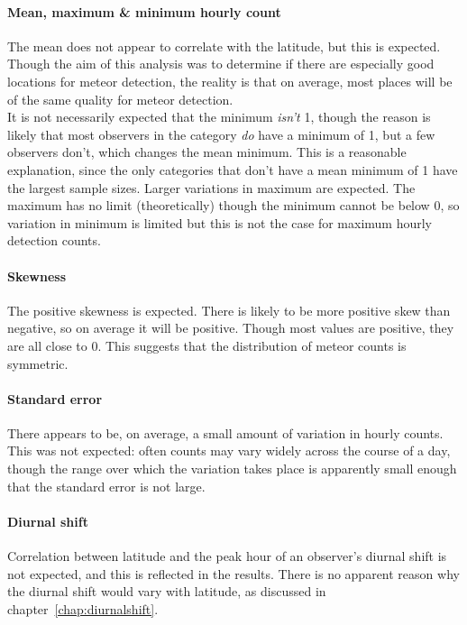 \paragraph{Mean, maximum \& minimum hourly count\\}
The mean does not appear to correlate with the latitude, but this is expected. Though the aim of this analysis was to determine if there are especially good locations for meteor detection, the reality is that on average, most places will be of the same quality for meteor detection. \\
It is not necessarily expected that the minimum {\it isn't} 1, though the reason is likely that most observers in the category {\it do} have a minimum of 1, but a few observers don't, which changes the mean minimum. This is a reasonable explanation, since the only categories that don't have a mean minimum of 1 have the largest sample sizes.
Larger variations in maximum are expected. The maximum has no limit (theoretically) though the minimum cannot be below 0, so variation in minimum is limited but this is not the case for maximum hourly detection counts.
\paragraph{Skewness\\}
The positive skewness is expected. There is likely to be more positive skew than negative, so on average it will be positive. Though most values are positive, they are all close to 0. This suggests that the distribution of meteor counts is symmetric.
\paragraph{Standard error\\}
There appears to be, on average, a small amount of variation in hourly counts. This was not expected: often counts may vary widely across the course of a day, though the range over which the variation takes place is apparently small enough that the standard error is not large.
\paragraph{Diurnal shift\\}
Correlation between latitude and the peak hour of an observer's diurnal shift is not expected, and this is reflected in the results. There is no apparent reason why the diurnal shift would vary with latitude, as discussed in chapter~\ref{chap:diurnalshift}.

